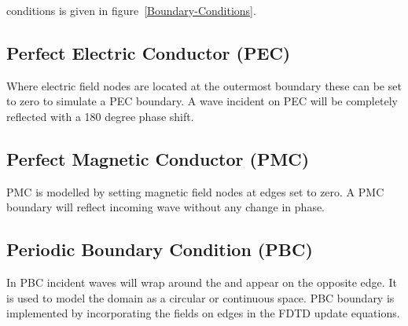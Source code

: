 conditions is given in figure~\ref{Boundary-Conditions}.
\subsection{Perfect Electric Conductor (PEC)}
Where electric field nodes are located at the outermost boundary these can be set to zero to simulate a PEC boundary. A wave incident on PEC will be completely reflected with a 180 degree phase shift.
\subsection{Perfect Magnetic Conductor (PMC)}
PMC is modelled by setting magnetic field nodes at edges set to zero. A PMC boundary will reflect incoming wave without any change in phase.
\subsection{Periodic Boundary Condition (PBC)}
In PBC incident waves will wrap around the and appear on the opposite edge. It is used to model the domain as a circular or continuous space. PBC boundary is implemented by incorporating the fields on edges in the FDTD update equations.
